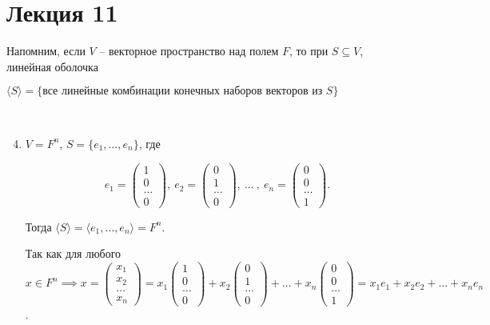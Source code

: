 \section{Лекция 11}

Напомним, если $V$ -- векторное пространство над полем $F$, то при $S \subseteq V$, линейная оболочка 

$\langle S \rangle = \{\text{все линейные комбинации конечных наборов векторов из } S\}$

\begin{example}~
    \begin{enumerate}
    \setcounter{enumi}{3}
    \item
        $V = F^n$, $S = \{e_1, \dots, e_n\}$, где

        \begin{equation*}
            e_1 = \begin{pmatrix} 1 \\ 0 \\ \dots \\ 0 \end{pmatrix}, \
            e_2 = \begin{pmatrix} 0 \\ 1 \\ \dots \\ 0 \end{pmatrix}, \
            \dots \ , \
            e_n = \begin{pmatrix} 0 \\ 0 \\ \dots \\ 1 \end{pmatrix}
        .\end{equation*}

        Тогда $\langle S \rangle = \langle e_1, \dots, e_n \rangle = F^n$.

        Так как для любого $x \in F^n \implies x = \begin{pmatrix} x_1 \\ x_2 \\ \dots \\ x_n \end{pmatrix} = x_1 \begin{pmatrix} 1 \\ 0 \\ \dots \\ 0 \end{pmatrix} + x_2 \begin{pmatrix} 0 \\ 1 \\ \dots \\ 0 \end{pmatrix} + \dots + x_n \begin{pmatrix} 0 \\ 0 \\ \dots \\ 1 \end{pmatrix} = x_1 e_1 + x_2 e_2 + \dots + x_n e_n$.
    \end{enumerate}
\end{example}


